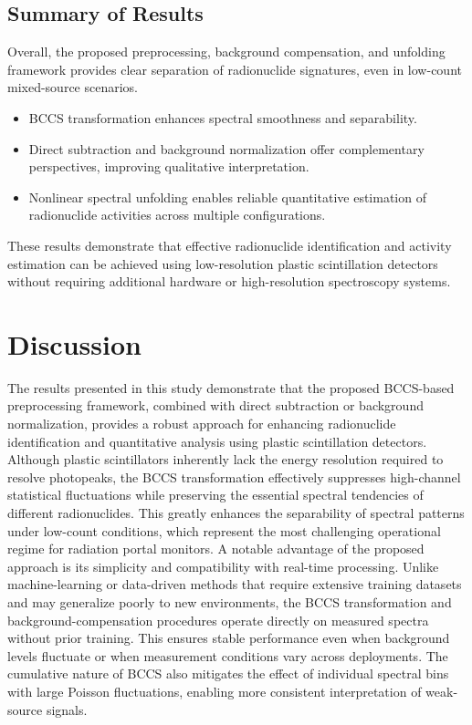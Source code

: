 \documentclass[10pt]{wlscirep}
\begin{document}
\subsection*{Summary of Results}

Overall, the proposed preprocessing, background compensation, and unfolding framework provides clear separation of radionuclide signatures, even in low-count mixed-source scenarios.

\begin{itemize}
    \item BCCS transformation enhances spectral smoothness and separability.
    \item Direct subtraction and background normalization offer complementary perspectives, improving qualitative interpretation.
    \item Nonlinear spectral unfolding enables reliable quantitative estimation of radionuclide activities across multiple configurations.
\end{itemize}

These results demonstrate that effective radionuclide identification and activity estimation can be achieved using low-resolution plastic scintillation detectors without requiring additional hardware or high-resolution spectroscopy systems.

\section*{Discussion}

The results presented in this study demonstrate that the proposed BCCS-based preprocessing framework, combined with direct subtraction or background normalization, provides a robust approach for enhancing radionuclide identification and quantitative analysis using plastic scintillation detectors. Although plastic scintillators inherently lack the energy resolution required to resolve photopeaks, the BCCS transformation effectively suppresses high-channel statistical fluctuations while preserving the essential spectral tendencies of different radionuclides. This greatly enhances the separability of spectral patterns under low-count conditions, which represent the most challenging operational regime for radiation portal monitors.
A notable advantage of the proposed approach is its simplicity and compatibility with real-time processing. Unlike machine-learning or data-driven methods that require extensive training datasets and may generalize poorly to new environments, the BCCS transformation and background-compensation procedures operate directly on measured spectra without prior training. This ensures stable performance even when background levels fluctuate or when measurement conditions vary across deployments. The cumulative nature of BCCS also mitigates the effect of individual spectral bins with large Poisson fluctuations, enabling more consistent interpretation of weak-source signals.
\end{document}
